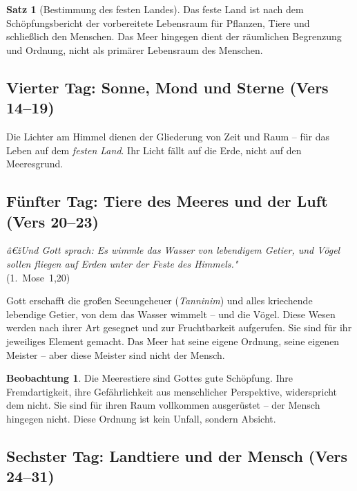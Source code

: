 ﻿\documentclass[a4paper,12pt]{article}
\theoremstyle{definition}
\newtheorem{theorem}{Satz}[section]
\newtheorem{observation}{Beobachtung}[section]
\begin{document}
\begin{theorem}[Bestimmung des festen Landes]
    Das feste Land ist nach dem Schöpfungsbericht der vorbereitete Lebensraum für
    Pflanzen, Tiere und schließlich den Menschen. Das Meer hingegen dient der
    räumlichen Begrenzung und Ordnung, nicht als primärer Lebensraum des Menschen.
\end{theorem}

\subsection{Vierter Tag: Sonne, Mond und Sterne (Vers 14--19)}

Die Lichter am Himmel dienen der Gliederung von Zeit und Raum -- für das Leben
auf dem \textit{festen Land}. Ihr Licht fällt auf die Erde, nicht auf den Meeresgrund.

\subsection{Fünfter Tag: Tiere des Meeres und der Luft (Vers 20--23)}

\begin{displayquote}
    \textit{â€žUnd Gott sprach: Es wimmle das Wasser von lebendigem Getier, und
    Vögel sollen fliegen auf Erden unter der Feste des Himmels."}\\
    \hfill (1.~Mose~1,20)
\end{displayquote}

Gott erschafft die großen Seeungeheuer (\textit{Tanninim}) und alles kriechende
lebendige Getier, von dem das Wasser wimmelt -- und die Vögel. Diese Wesen werden
nach ihrer Art gesegnet und zur Fruchtbarkeit aufgerufen. Sie sind für ihr
jeweiliges Element gemacht. Das Meer hat seine eigene Ordnung, seine eigenen
Meister -- aber diese Meister sind nicht der Mensch.

\begin{observation}
    Die Meerestiere sind Gottes gute Schöpfung. Ihre Fremdartigkeit, ihre
    Gefährlichkeit aus menschlicher Perspektive, widerspricht dem nicht. Sie sind
    für ihren Raum vollkommen ausgerüstet -- der Mensch hingegen nicht. Diese
    Ordnung ist kein Unfall, sondern Absicht.
\end{observation}

\subsection{Sechster Tag: Landtiere und der Mensch (Vers 24--31)}
\end{document}
